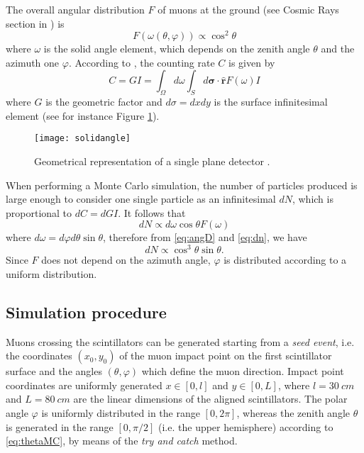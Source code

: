 The overall angular distribution $F$ of muons at the ground (see Cosmic Rays section in \cite{PDG}) is
\begin{equation}\label{eq:angD}
F\left(\omega\left(\theta,\varphi\right)\right) \propto \cos^2\theta
\end{equation}
where $\omega$ is the solid angle element, which depends on the zenith angle $\theta$ and the azimuth one $\varphi$. According to \cite{Sullivan}, the counting rate $C$ is given by
\begin{equation}
C =GI=\int_{\Omega} d\omega\int_{S} d\bm{\sigma}\cdot \mathbf{\hat{r}}F(\omega)I
\end{equation}
where $G$ is the geometric factor and $d\sigma = dxdy$ is the surface infinitesimal element (see for instance Figure \ref{fig:planedetector}).
\begin{figure}[!bh]
	\centering
	\texttt{[image: solidangle]}
	\caption{Geometrical representation of a single plane detector \cite{Sullivan}.}
	\label{fig:planedetector}
\end{figure}
When performing a Monte Carlo simulation, the number of particles produced is large enough to consider one single particle as an infinitesimal $dN$, which is proportional to $dC=dGI$. It follows that
\begin{equation}\label{eq:dn}
dN \propto d\omega \cos\theta F(\omega)
\end{equation}
where $d\omega=d\varphi d\theta \sin\theta$, therefore from \eqref{eq:angD} and \eqref{eq:dn}, we have
\begin{equation}\label{eq:thetaMC}
dN \propto \cos^3\theta\sin\theta.
\end{equation}
Since $F$ does not depend on the azimuth angle, $\varphi$ is distributed according to a uniform distribution.

\subsection{Simulation procedure}

Muons crossing the scintillators can be generated starting from a \emph{seed event}, i.e. the coordinates $(x_0,y_0)$ of the muon impact point on the first scintillator surface and the angles $(\theta , \varphi)$ which define the muon direction.		
Impact point coordinates are uniformly generated $x \in [0,l]$ and $y \in [0,L]$, where $l = \SI{30}{cm}$ and $L = \SI{80}{cm}$ are the linear dimensions of the aligned scintillators.
The polar angle $\varphi$ is uniformly distributed in the range $\left[0,2\pi\right]$, whereas the zenith angle $\theta$ is generated in the range $\left[0,\pi/2\right]$ (i.e. the upper hemisphere) according to \eqref{eq:thetaMC}, by means of the \emph{try and catch} method.\\

